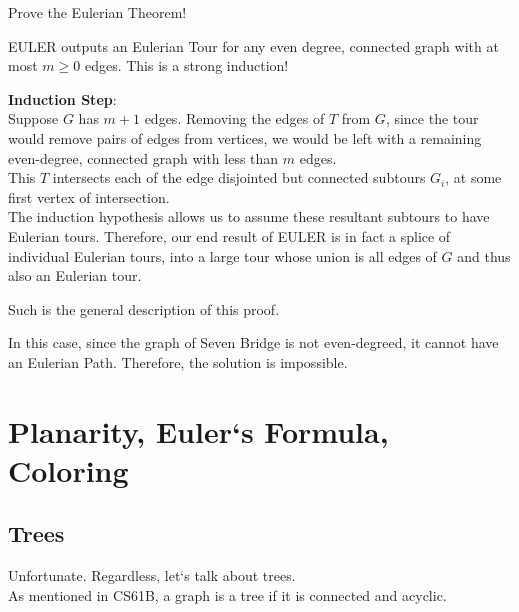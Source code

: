 \begin{ln-think}{Prove the Eulerian Theorem!}{}
\begin{bindenum}
{            EULER outputs an Eulerian Tour for any even degree, connected graph with at most $m \geq 0$ edges. This is a strong induction!
        }
        \item[] {
            \textbf{Induction Step}: \\
            Suppose $G$ has $m + 1$ edges. Removing the edges of $T$ from $G$, since the tour would remove pairs of edges from vertices, we would be left with a remaining even-degree, connected graph with less than $m$ edges. \\
            This $T$ intersects each of the edge disjointed but connected subtours $G_i$, at some first vertex of intersection. \\
            The induction hypothesis allows us to assume these resultant subtours to have Eulerian tours. Therefore, our end result of EULER is in fact a splice of individual Eulerian tours, into a large tour whose union is all edges of $G$ and thus also an Eulerian tour.
        }
    \end{bindenum}
    Such is the general description of this proof.
\end{ln-think}
In this case, since the graph of Seven Bridge is not even-degreed, it cannot have an Eulerian Path. Therefore, the solution is impossible.

\section{Planarity, Euler`s Formula, Coloring}

\subsection{Trees}
Unfortunate. Regardless, let`s talk about trees. \\
As mentioned in CS61B, a graph is a tree if it is connected and acyclic. \\

